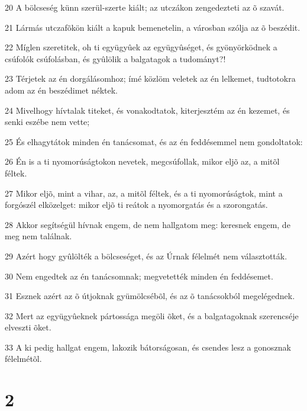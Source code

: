 \par 20 A bölcseség künn szerül-szerte kiált; az utczákon zengedezteti az õ szavát.
\par 21 Lármás utczafõkön kiált a kapuk bemenetelin, a városban szólja az õ beszédit.
\par 22 Míglen szeretitek, oh ti együgyûek az együgyûséget, és gyönyörködnek a csúfolók csúfolásban, és gyûlölik a balgatagok a tudományt?!
\par 23 Térjetek az én dorgálásomhoz; ímé közlöm veletek az én lelkemet, tudtotokra adom az én beszédimet néktek.
\par 24 Mivelhogy hívtalak titeket, és vonakodtatok, kiterjesztém az én kezemet, és senki eszébe nem vette;
\par 25 És elhagytátok minden én tanácsomat, és az én feddésemmel nem gondoltatok:
\par 26 Én is a ti nyomorúságtokon nevetek, megcsúfollak, mikor eljõ az, a mitõl féltek.
\par 27 Mikor eljõ, mint a vihar, az, a mitõl féltek, és a ti nyomorúságtok, mint a forgószél elközelget: mikor eljõ ti reátok a nyomorgatás és a szorongatás.
\par 28 Akkor segítségül hívnak engem, de nem hallgatom meg: keresnek engem, de meg nem találnak.
\par 29 Azért hogy gyûlölték a bölcseséget, és az Úrnak félelmét nem választották.
\par 30 Nem engedtek az én tanácsomnak; megvetették minden én feddésemet.
\par 31 Esznek azért az õ útjoknak gyümölcsébõl, és az õ tanácsokból megelégednek.
\par 32 Mert az együgyûeknek pártossága megöli õket, és a balgatagoknak szerencséje elveszti õket.
\par 33 A ki pedig hallgat engem, lakozik bátorságosan, és csendes lesz a gonosznak félelmétõl.

\chapter{2}

